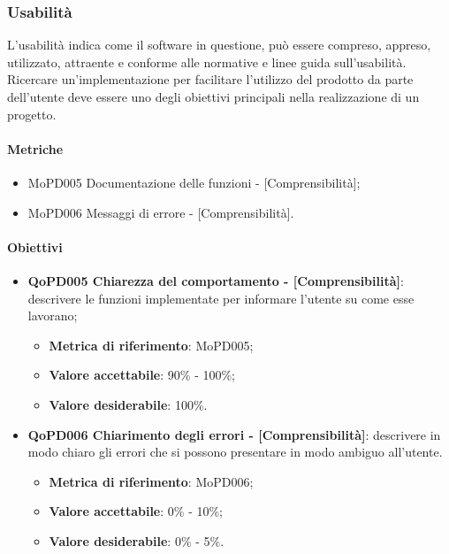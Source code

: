 \documentclass[../piano-di-qualifica.tex]{subfiles}
\begin{document}
\subsubsection{Usabilità}%
\label{sub:usabilita}
L'usabilità indica come il software in questione, può essere compreso, appreso, utilizzato, attraente e conforme alle normative e linee guida sull'usabilità.
Ricercare un'implementazione per facilitare l'utilizzo del prodotto da parte dell'utente deve essere uno degli obiettivi principali nella realizzazione di un progetto.

\paragraph{Metriche}
\label{sub:metriche}
\begin{itemize}
    \item MoPD005 Documentazione delle funzioni - [Comprensibilità];
    \item MoPD006 Messaggi di errore - [Comprensibilità].
\end{itemize}

\paragraph{Obiettivi}
\label{sub:obiettivi}
\begin{itemize}
    \item \textbf{QoPD005 Chiarezza del comportamento - [Comprensibilità]}: descrivere le funzioni implementate per informare l'utente su come esse lavorano;
        \begin{itemize}
            \item \textbf{Metrica di riferimento}: MoPD005;
            \item \textbf{Valore accettabile}: 90\% - 100\%;
            \item \textbf{Valore desiderabile}: 100\%.
        \end{itemize}
    \item \textbf{QoPD006 Chiarimento degli errori - [Comprensibilità]}: descrivere in modo chiaro gli errori che si possono presentare in modo ambiguo all'utente.
        \begin{itemize}
            \item \textbf{Metrica di riferimento}: MoPD006;
            \item \textbf{Valore accettabile}: 0\% - 10\%;
            \item \textbf{Valore desiderabile}: 0\% - 5\%.
        \end{itemize}
\end{itemize}
\end{document}
